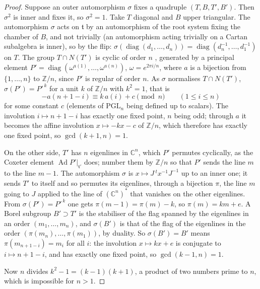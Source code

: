 \documentclass[11pt,a4paper]{amsart}
\theoremstyle{definition}
\theoremstyle{remark}
\newcommand{\PGL}{\mathrm{PGL}}
\newcommand{\C}{\mathbb C}
\begin{document}
\begin{proof}
Suppose an outer automorphism $\sigma$ fixes a quadruple $(T,B,T',B')$. Then $\sigma^2$ is inner and fixes it, so $\sigma^2 = 1$. Take $T$ diagonal and $B$ upper triangular. The automorphism $\sigma$ acts on $\mathfrak t$ by an automorphism of the root system fixing the chamber of $B$, and not trivially (an automorphism acting trivially on a Cartan subalgebra is inner), so by the flip: $\sigma(\operatorname{diag}(d_1,\dots,d_n)) = \operatorname{diag}(d_n^{-1},\dots,d_1^{-1})$ on $T$. The group $T \cap N(T')$ is cyclic of order $n$ \cite{problems}, generated by a principal element $P' = \operatorname{diag}(\omega^{a(1)},\dots,\omega^{a(n)})$, $\omega = e^{2\pi i/n}$, where $a$ is a bijection from $\{1,\dots,n\}$ to $\mathbb Z/n$, since $P'$ is regular of order $n$. As $\sigma$ normalises $T\cap N(T')$, $\sigma(P') = P'^{\,k}$ for a unit $k$ of $\mathbb Z/n$ with $k^2 = 1$, that is
\[
-a(n+1-i) \equiv k\,a(i) + c \pmod n \qquad (1 \le i \le n)
\]
for some constant $c$ (elements of $\PGL_n$ being defined up to scalars). The involution $i \mapsto n+1-i$ has exactly one fixed point, $n$ being odd; through $a$ it becomes the affine involution $x \mapsto -kx - c$ of $\mathbb Z/n$, which therefore has exactly one fixed point, so $\gcd(k+1, n) = 1$.

On the other side, $T'$ has $n$ eigenlines in $\C^n$, which $P'$ permutes cyclically, as the Coxeter element $\operatorname{Ad}P'|_{\mathfrak t'}$ does; number them by $\mathbb Z/n$ so that $P'$ sends the line $m$ to the line $m-1$. The automorphism $\sigma$ is $x \mapsto J\,{}^t x^{-1} J^{-1}$ up to an inner one; it sends $T'$ to itself and so permutes its eigenlines, through a bijection $\pi$, the line $m$ going to $J$ applied to the line of $(\C^n)^*$ that vanishes on the other eigenlines. From $\sigma(P') = P'^{\,k}$ one gets $\pi(m-1) = \pi(m) - k$, so $\pi(m) = km + e$. A Borel subgroup $B' \supset T'$ is the stabiliser of the flag spanned by the eigenlines in an order $(m_1,\dots,m_n)$, and $\sigma(B')$ is that of the flag of the eigenlines in the order $(\pi(m_n), \dots, \pi(m_1))$, by duality. So $\sigma(B') = B'$ means $\pi(m_{n+1-i}) = m_i$ for all $i$: the involution $x \mapsto kx + e$ is conjugate to $i \mapsto n+1-i$, and has exactly one fixed point, so $\gcd(k-1, n) = 1$.

Now $n$ divides $k^2 - 1 = (k-1)(k+1)$, a product of two numbers prime to $n$, which is impossible for $n > 1$.
\end{proof}
\end{document}
